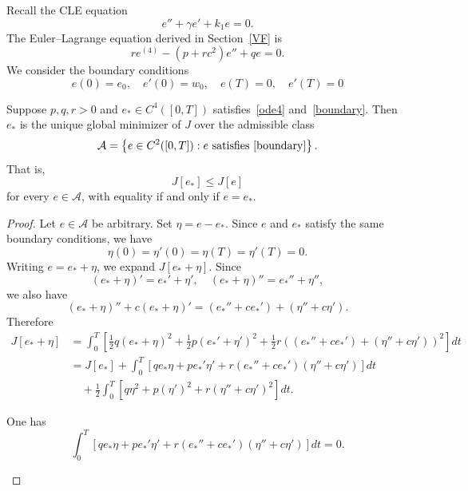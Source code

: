 ﻿\documentclass[12pt]{article}
\begin{document}
Recall the CLE equation
\begin{equation}\label{remind}
 e'' + \gamma e' + k_1e = 0.
\end{equation}
The Euler--Lagrange equation derived in Section~\ref{VF} is
\begin{equation}\label{ode4}
 re^{(4)}
 -
 (p + rc^2)e''
 +
 qe
 =
 0.
\end{equation}
We consider the boundary conditions
\begin{equation}\label{boundary}
 e(0) = e_0,\quad e'(0) = w_0,\quad e(T) = 0,\quad e'(T) = 0
\end{equation}
\begin{lemma}\label{minimizer}
Suppose $p, q, r > 0$ and $e_* \in C^4([0, T])$ satisfies~\eqref{ode4} and~\eqref{boundary}. Then $e_*$ is the unique global minimizer of $J$ over the admissible class
\[
 \mathcal A = \left\{ e \in C^2([0, T]): e \text{ satisfies } \eqref{boundary} \right\}.
\]
That is,
\[
 J[e_*] \leq J[e]
\]
for every $e \in \mathcal A$, with equality if and only if $e = e_*$.
\end{lemma}\begin{proof}
Let $e \in \mathcal A$ be arbitrary.
Set $\eta = e - e_*.$ Since $e$ and $e_*$ satisfy the same boundary conditions, we have
\[
 \eta(0) = \eta'(0) = \eta(T) = \eta'(T) = 0.
\]
Writing $e = e_*+\eta$, we expand $J[e_*+\eta]$. Since
\[
 (e_*+\eta)' = e_*' + \eta',\quad (e_*+\eta)'' = e_*'' + \eta'',
\]
we also have
\[
 (e_*+\eta)'' + c(e_*+\eta)' = (e_*'' + ce_*') + (\eta'' + c\eta').
\]
Therefore
\begin{align*}
 J[e_*+\eta]
 & = \int_0^T
 \left[
 \frac{1}{2} q(e_*+\eta)^2
 +
 \frac{1}{2} p(e_*' + \eta')^2
 +
 \frac{1}{2} r\left((e_*'' + ce_*') + (\eta'' + c\eta')\right)^2
 \right]dt\\
 & =
 J[e_*] + \int_0^T
 \left[
 qe_*\eta
 +
 pe_*'\eta'
 +
 r(e_*'' + ce_*')(\eta'' + c\eta')
 \right]dt\\
 &\quad+
 \frac{1}{2} \int_0^T
 \left[
 q\eta^2
 +
 p(\eta')^2
 +
 r(\eta'' + c\eta')^2
 \right]dt.
\end{align*}\begin{claim}
One has
\[ \int_0^T \left[ qe_*\eta + pe_*'\eta' + r(e_*'' + ce_*')(\eta'' + c\eta') \right]dt = 0.
\]
\end{claim}


\end{proof}
\end{document}
